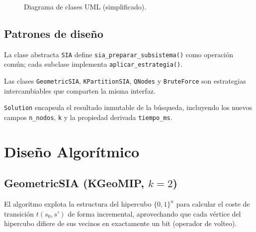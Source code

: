 \documentclass[11pt,letterpaper]{article}
\begin{document}
\begin{figure}[H]
  \caption{Diagrama de clases UML (simplificado).}
  \label{fig:clases}
\end{figure}

\subsection{Patrones de diseño}

\begin{description}[leftmargin=1.5cm]
  \item[\textbf{Template Method}] La clase abstracta \texttt{SIA} define
    \texttt{sia\_preparar\_subsistema()} como operación común; cada subclase
    implementa \texttt{aplicar\_estrategia()}.
  \item[\textbf{Strategy}] Las clases \texttt{GeometricSIA}, \texttt{KPartitionSIA},
    \texttt{QNodes} y \texttt{BruteForce} son estrategias intercambiables que
    comparten la misma interfaz.
  \item[\textbf{Value Object}] \texttt{Solution} encapsula el resultado inmutable
    de la búsqueda, incluyendo los nuevos campos \texttt{n\_nodos}, \texttt{k}
    y la propiedad derivada \texttt{tiempo\_ms}.
\end{description}

\section{Diseño Algorítmico}
\label{sec:algoritmos}

\subsection{GeometricSIA (KGeoMIP, $k=2$)}

El algoritmo explota la estructura del hipercubo $\{0,1\}^n$ para calcular
el coste de transición $t(s_0, s')$ de forma incremental, aprovechando que
cada vértice del hipercubo difiere de sus vecinos en exactamente un bit
(operador de volteo).
\end{document}
